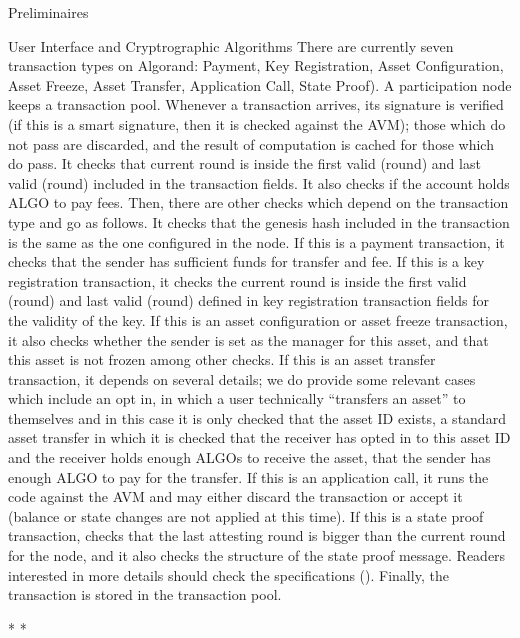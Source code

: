\documentclass[10pt,a4paper]{article}
\begin{document}
\begin{section}{Preliminaires}
\begin{subsection}{User Interface and Cryptrographic Algorithms}
    There are currently seven transaction types on Algorand:
        Payment, 
        Key Registration, 
        Asset Configuration, 
        Asset Freeze, 
        Asset Transfer, 
        Application Call, 
        State Proof).
    A participation node keeps a transaction pool. 
    Whenever a transaction arrives, 
        its signature is verified (if this is a smart signature, then it is checked against the AVM); those
        which do not pass are discarded, and the result of computation is cached for those which do pass.
    It checks that current round is inside the first valid (round) and last valid (round) included in the
        transaction fields.
    It also checks if the account holds ALGO to pay fees. Then, there are other checks which depend on the
        transaction type and go as follows.
    It checks that the genesis hash included in the transaction is the same as the one configured in the node.
    If this is a payment transaction, it checks that the sender has sufficient funds for transfer and fee.
    If this is a key  registration transaction, it checks the current round is inside the first valid (round) 
        and last valid (round) defined in key registration transaction fields for the validity of the key.
    If this is an asset configuration or asset freeze transaction, it also checks whether the sender is set 
        as the manager for this asset, and that this asset is not frozen among other checks.
    If this is an asset transfer transaction, it depends on several details; we do provide some relevant 
        cases which include an opt in, in which a user technically ``transfers an asset'' to themselves and in this
        case it is only checked that the asset ID exists, 
        a standard asset transfer in which it is checked that the receiver has opted in to this asset ID and the 
        receiver holds enough ALGOs to receive the asset, that the sender has enough ALGO to pay for the transfer.
    If this is an application call, it runs the code against the AVM and may either discard the transaction or 
        accept it (balance or state changes are not applied at this time).
    If this is a state proof transaction, checks that the last attesting round is bigger than the current 
        round for the node, and it also checks the structure of the state proof message.
    Readers interested in more details should check the specifications (\cite{algorand:specs}).
    Finally, the transaction is stored in the transaction pool. 

    {\centering * * *\par}


\end{subsection}
\end{section}
\end{document}
